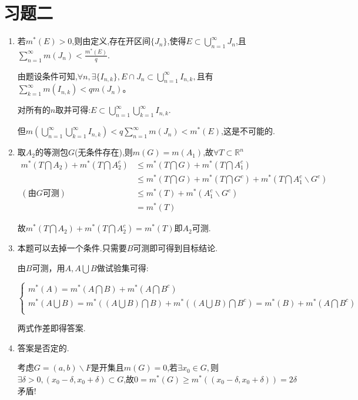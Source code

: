 \documentclass[UTF8, a4paper, 12pt, oneside, onecolumn]{article}
\numberwithin{equation}{section}
\numberwithin{figure}{section}
\numberwithin{table}{section}
\theoremstyle{nonumberplain}	%
\theoremstyle{plain}	%
\theoremstyle{plain}	%
\theoremstyle{plain}	%
\theoremstyle{plain}	%
\theoremstyle{nonumberplain}
\begin{document}
\part{习题二}
\begin{enumerate}
	
	\item 若$m^*(E)>0$,则由定义,存在开区间$\{J_n\}$,使得$E\subset \displaystyle\bigcup_{n=1}^{\infty}J_n$,且$\displaystyle \sum_{n=1}^{\infty}m(J_n)<\frac{m^*(E)}{q}$.
	
	由题设条件可知,$\forall n,\exists\{I_{n,k}\},E\cap J_n\subset \displaystyle\bigcup_{n=1}^{\infty}I_{n,k},$且有$\displaystyle \sum_{k=1}^{\infty}m(I_{n,k})<qm(J_n)$。
	
	对所有的$n$取并可得:$E\subset\displaystyle\bigcup_{n=1}^{\infty}\bigcup_{k=1}^{\infty}I_{n,k}$.
	
	但$m(\displaystyle\bigcup_{n=1}^{\infty}\bigcup_{k=1}^{\infty}I_{n,k})<\displaystyle q\sum_{n=1}^{\infty}m(J_{n})<m^*(E)$,这是不可能的.
	
	\item 取$A_2$的等测包$G$(无条件存在),则$m(G)=m(A_1)$,故$\forall T\subset \mathbb{R}^n$
	\begin{align*}
	m^*(T\bigcap A_2)+m^*(T\bigcap A_2^c)&\leqslant m^*(T\bigcap G)+m^*(T\bigcap A_1^c)\\
	&\leqslant m^*(T\bigcap G)+m^*(T\bigcap G^c)+m^*(T\bigcap A_1^c\backslash G^c)\\
	(\text{由}G\text{可测})&\leqslant m^*(T)+m^*( A_1^c\backslash G^c)\\
	&=m^*(T)
	\end{align*}
	
	故$m^*(T\bigcap A_2)+m^*(T\bigcap A_2^c)=m^*(T)$即$A_2$可测.
	
	\item 本题可以去掉一个条件.只需要$B$可测即可得到目标结论.
	
	由$B$可测，用$A,A\bigcup B$做试验集可得:
	
	$\left\{ \begin{array}{c}
	m^*(A)=m^*(A\bigcap B)+m^*(A\bigcap B^c)\\
	m^*(A\bigcup B)=m^*((A\bigcup B)\bigcap B)+m^*((A\bigcup B)\bigcap B^c)=m^*(B)+m^*(A\bigcap B^c)\\
	\end{array}\right.$
	
	两式作差即得答案.
	\item 答案是否定的.
	
	考虑$G=(a,b)\backslash F$是开集且$m(G)=0$,若$\exists x_0\in G,$则$\exists \delta>0,(x_0-\delta,x_0+\delta)\subset G$,故$0=m^*(G)\geqslant m^*\left((x_0-\delta,x_0+\delta)\right)=2\delta$矛盾! 
	

\end{enumerate}
\end{document}
